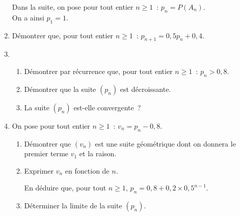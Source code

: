 \begin{enumerate}
\medskip
Dans la suite, on pose pour tout entier $n \geqslant 1$~: \:$p_n = P\left(A_n\right)$. \\
On a ainsi $p_1 = 1$.
\medskip     
     \item Démontrer que, pour tout entier $n \geqslant 1$~: $p_{n+1} = 0,5p_n + 0,4$.
     \item
     \begin{enumerate}[label=\alph*.]
          \item Démontrer par récurrence que, pour tout entier $n \geqslant 1$~: $p_n > 0,8$.
          \item  Démontrer que la suite $(p_n)$ est décroissante.
          \item  La suite $\left(p_n\right)$ est-elle convergente~?
     \end{enumerate}
     \item On pose pour tout entier $n \geqslant 1$~: $v_n = p_n - 0,8$.
     \begin{enumerate}[label=\alph*.]
          \item Démontrer que $\left(v_n\right)$ est une suite géométrique dont on donnera le premier terme $v_1$ et la raison.
          \item  Exprimer $v_n$ en fonction de $n$.
          \par
          En déduire que, pour tout $n \geqslant 1$,\: $p_n = 0,8 + 0,2 \times  0,5^{n-1}$.
          \item  Déterminer la limite de la suite $\left(p_n\right)$.
     \end{enumerate}
\end{enumerate}
